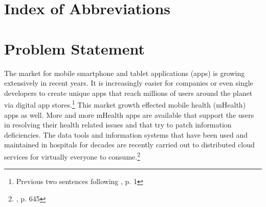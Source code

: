 \documentclass[
	a4paper,
	oneside,
	12pt,
	liststotocnumbered
]{article}
\let\cite\textcite
\begin{document}
\renewcommand{\figurename}{Figure}
\renewcommand{\tablename}{Table}
\renewcommand\thefigure{\arabic{section}-\arabic{figure}}
\renewcommand\thetable{Tab. \arabic{section}-\arabic{table}}
\newcommand{\todo}[1]{\textbf{\textsc{\textcolor{red}{TODO: #1}}}}

\newcommand{\mH}{mHealth }
\newcommand{\ap}{app provider}
\newcommand{\pp}{privacy policy}
\newcommand{\pps}{privacy policies}
\newcommand{\sca}{static code analysis}
\newcommand{\Sca}{Static code analysis}
\newcommand{\pra}{privacy risk assessment}




\tableofcontents
\newpage

\section*{Index of Abbreviations}
\begin{acronym}[TTTTTTTTTTTTTTTTTTTT]
\end{acronym}
\newpage

\normalsize
{}

\section{Problem Statement}
The market for mobile smartphone and tablet applications (apps) is growing extensively in recent years.
It is increasingly easier for companies or even single developers to create unique apps that reach millions of users around the planet via digital app stores.\footnote{Previous two sentences following \cite{Enck2011}, p. 1}
This market growth effected mobile health (\acs{mHealth}) apps as well. 
More and more \mH apps are available that support the users in resolving their health related issues and that try to patch information deficiencies. 
The data tools and information systems that have been used and maintained in hospitals for decades are recently carried out to distributed cloud services for virtually everyone to consume.\footnote{\cite{He2014}, p. 645}
\end{document}

